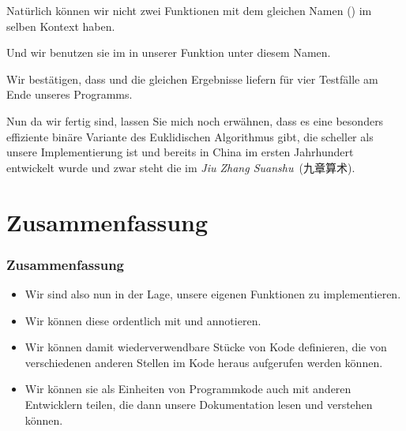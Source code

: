\documentclass[aspectratio=169,mathserif,notheorems]{beamer}%
\begin{document}
\begin{frame}[t]
{{\begin{itemize}
{\item<33-> Natürlich können wir nicht zwei Funktionen mit dem gleichen Namen () im selben Kontext haben.%
}%
%
%
%
%
%
\item<36-> Und wir benutzen sie im  in unserer Funktion  unter diesem Namen.%
%
\item<37-> Wir bestätigen, dass  und  die gleichen Ergebnisse liefern für vier Testfälle am Ende unseres Programms.%
%
\item<38-> Nun da wir fertig sind, lassen Sie mich noch erwähnen, dass es eine besonders effiziente binäre Variante des Euklidischen Algorithmus gibt, die scheller als unsere Implementierung ist und bereits in China im ersten Jahrhundert~ entwickelt wurde und zwar steht die im \emph{Jiu Zhang Suanshu}~(九章算术).%
%
\end{itemize}%
}}%
%
%
%
\end{frame}%
%
\section{Zusammenfassung}%
%
\begin{frame}%
\frametitle{Zusammenfassung}%
\begin{itemize}%
\item Wir sind also nun in der Lage, unsere eigenen Funktionen zu implementieren.%
\item<2-> Wir können diese ordentlich mit  und  annotieren.%
\item<3-> Wir können damit wiederverwendbare Stücke von Kode definieren, die von verschiedenen anderen Stellen im Kode heraus aufgerufen werden können.%
\item<4-> Wir können sie als Einheiten von Programmkode auch mit anderen Entwicklern teilen, die dann unsere Dokumentation lesen und verstehen können.%
\end{itemize}%
\end{frame}%
%
\endPresentation%
\end{document}
